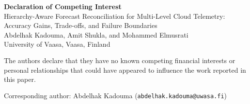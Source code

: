 \documentclass[11pt,a4paper]{article}
\begin{document}
\begin{center}
{\Large\bfseries Declaration of Competing Interest}\\[1em]
{\large Hierarchy-Aware Forecast Reconciliation for Multi-Level Cloud Telemetry:\\
Accuracy Gains, Trade-offs, and Failure Boundaries}\\[1em]
Abdelhak Kadouma, Amit Shukla, and Mohammed Elmusrati\\
University of Vaasa, Vaasa, Finland
\end{center}

\vspace{2em}

\noindent
The authors declare that they have no known competing financial interests or
personal relationships that could have appeared to influence the work reported
in this paper.

\vspace{3em}
\noindent
Corresponding author: Abdelhak Kadouma (\texttt{abdelhak.kadouma@uwasa.fi})
\end{document}
